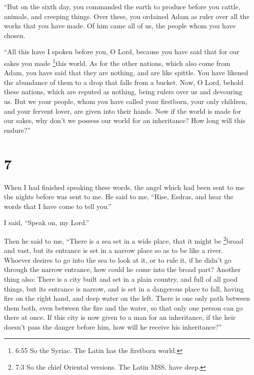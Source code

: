  ``But on the sixth day, you commanded the earth to produce
before you cattle, animals, and creeping things.  Over
these, you ordained Adam as ruler over all the works that you have made.
Of him came all of us, the people whom you have chosen.

 ``All this have I spoken before you, O Lord, because you
have said that for our sakes you made \footnote{6:55 So the Syriac. The
  Latin has the firstborn world.}this world.  As for the
other nations, which also come from Adam, you have said that they are
nothing, and are like spittle. You have likened the abundance of them to
a drop that falls from a bucket.  Now, O Lord, behold these
nations, which are reputed as nothing, being rulers over us and
devouring us.  But we your people, whom you have called
your firstborn, your only children, and your fervent lover, are given
into their hands.  Now if the world is made for our sakes,
why don't we possess our world for an inheritance? How long will this
endure?''

\hypertarget{section-6}{%
\section{7}\label{section-6}}

 When I had finished speaking these words, the angel which
had been sent to me the nights before was sent to me.  He
said to me, ``Rise, Esdras, and hear the words that I have come to tell
you.''

 I said, ``Speak on, my Lord.''

Then he said to me, ``There is a sea set in a wide place, that it might
be \footnote{7:3 So the chief Oriental versions. The Latin MSS. have
  deep.}broad and vast,  but its entrance is set in a narrow
place so as to be like a river.  Whoever desires to go into
the sea to look at it, or to rule it, if he didn't go through the narrow
entrance, how could he come into the broad part?  Another
thing also: There is a city built and set in a plain country, and full
of all good things,  but its entrance is narrow, and is set
in a dangerous place to fall, having fire on the right hand, and deep
water on the left.  There is one only path between them
both, even between the fire and the water, so that only one person can
go there at once.  If this city is now given to a man for an
inheritance, if the heir doesn't pass the danger before him, how will he
receive his inheritance?''

